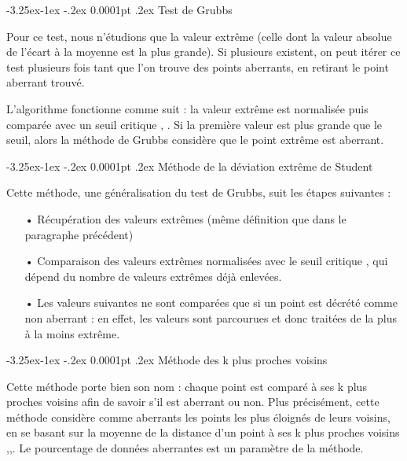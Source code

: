 \documentclass[a4paper,12pt]{article} %
\makeatletter
\renewcommand\paragraph{\@startsection{paragraph}{4}{\z@}%
                                      {-3.25ex\@plus -1ex \@minus -.2ex}%
                                      {0.0001pt \@plus .2ex}%
                                      {\normalfont\normalsize\bfseries}}
\makeatother
\begin{document}
					\paragraph{Test de Grubbs}
                        					
                        Pour ce test, nous n’étudions que la valeur extrême (celle dont la valeur absolue de l’écart à la moyenne est la plus grande). Si plusieurs existent, on peut itérer ce test plusieurs fois tant que l'on trouve des points aberrants, en retirant le point aberrant trouvé.
                        
                        L'algorithme fonctionne comme suit : la valeur extrême est normalisée puis comparée avec un seuil critique \cite{Grubbs1}, \cite{Grubbs2}. Si la première valeur est plus grande que le seuil, alors la méthode de Grubbs considère que le point extrême est aberrant.


					\paragraph{Méthode de la déviation extrême de Student}
					
                        Cette méthode, une généralisation du test de Grubbs, suit les étapes suivantes : 
                        \begin{itemize}
                        \item[•] Récupération des valeurs extrêmes (même déﬁnition que dans le paragraphe précédent)
                        \item[•] Comparaison des valeurs extrêmes normalisées avec le seuil critique \cite{DES}, qui dépend du nombre de valeurs extrêmes déjà enlevées.
                        \item[•] Les valeurs suivantes ne sont comparées que si un point est décrété comme non aberrant : en eﬀet, les valeurs sont parcourues et donc traitées de la plus à la moins extrême.
                         \end{itemize}
					\paragraph{Méthode des k plus proches voisins}
					
					    Cette méthode porte bien son nom : chaque point est comparé à ses k plus proches voisins afin de savoir s'il est aberrant ou non. Plus précisément, cette méthode considère comme aberrants les points les plus éloignés de leurs voisins, en se basant sur la moyenne de la distance d'un point à ses k plus proches voisins \cite{KNN1},\cite{KNN2},\cite{KNN3}. Le pourcentage de données aberrantes est un paramètre de la méthode.
    					
\end{document}
